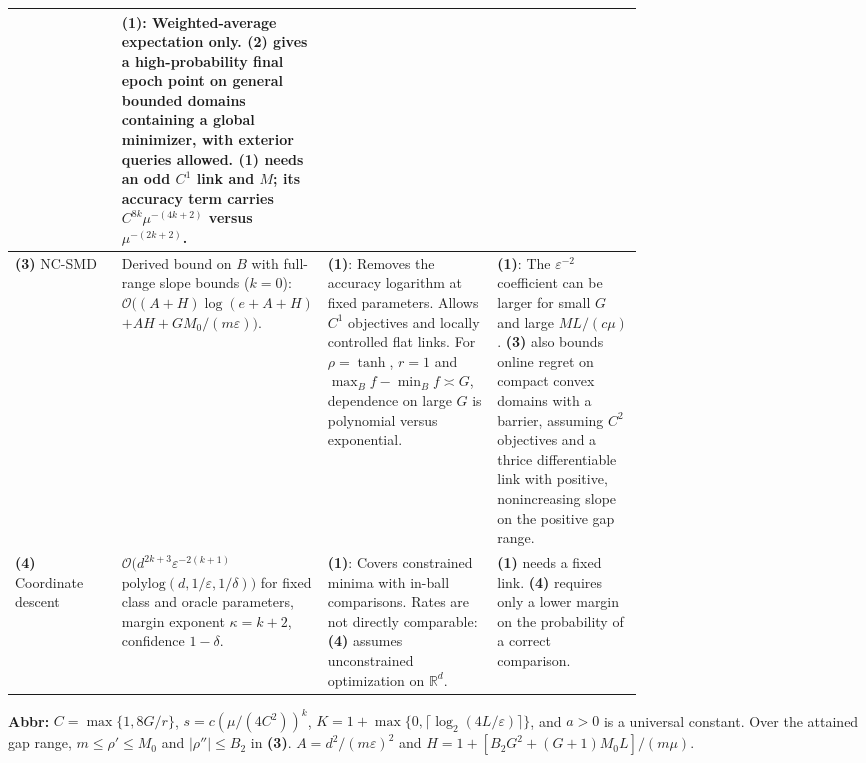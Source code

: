 \begin{table}[tp]
\begin{threeparttable}
\begin{tabularx}{\linewidth}{@{}>{\raggedright\arraybackslash}p{0.17\linewidth}>{\raggedright\arraybackslash}p{0.29\linewidth}>{\raggedright\arraybackslash}p{0.27\linewidth}>{\raggedright\arraybackslash}X@{}}
& \textbf{(1)}: Weighted-average expectation only. \textbf{(2)} gives a high-probability final epoch point on general bounded domains containing a global minimizer, with exterior queries allowed. \textbf{(1)} needs an odd $C^1$ link and $M$; its accuracy term carries $C^{8k}\mu^{-(4k+2)}$ versus $\mu^{-(2k+2)}$. \\
\midrule
\textbf{(3)} NC-SMD \citep[Thms.~4, 13]{ftdKumagai2017v2}
& Derived bound on $B$ with full-range slope bounds ($k=0$):
$\mathcal{O}\!\big((A+H)\log(e+A+H)$ $+AH+GM_0/(m\varepsilon)\big)$.
& \textbf{(1)}: Removes the accuracy logarithm at fixed parameters. Allows $C^1$ objectives and locally controlled flat links. For $\rho=\tanh$, $r=1$ and $\max_B f-\min_B f\asymp G$, dependence on large $G$ is polynomial versus exponential.
& \textbf{(1)}: The $\varepsilon^{-2}$ coefficient can be larger for small $G$ and large $ML/(c\mu)$. \textbf{(3)} also bounds online regret on compact convex domains with a barrier, assuming $C^2$ objectives and a thrice differentiable link with positive, nonincreasing slope on the positive gap range. \\
\midrule
\textbf{(4)} Coordinate descent \citep[Thm.~2]{ftdJamieson2012v1}
& $\mathcal{O}\!\big(d^{2k+3}\varepsilon^{-2(k+1)}$ $\mathrm{polylog}(d,1/\varepsilon,1/\delta)\big)$ for fixed class and oracle parameters, margin exponent $\kappa=k+2$, confidence $1-\delta$.
& \textbf{(1)}: Covers constrained minima with in-ball comparisons. Rates are not directly comparable: \textbf{(4)} assumes unconstrained optimization on $\mathbb R^d$.
& \textbf{(1)} needs a fixed link. \textbf{(4)} requires only a lower margin on the probability of a correct comparison. \\
\bottomrule
\end{tabularx}
\begin{tablenotes}[flushleft]\footnotesize
\item[] \textbf{Abbr:} $C=\max\{1,8G/r\}$, $s=c(\mu/(4C^2))^k$, $K=1+\max\{0,\lceil\log_2(4L/\varepsilon)\rceil\}$, and $a>0$ is a universal constant. Over the attained gap range, $m\le\rho'\le M_0$ and $|\rho''|\le B_2$ in \textbf{(3)}. $A=d^2/(m\varepsilon)^2$ and $H=1+[B_2G^2+(G+1)M_0L]/(m\mu)$.
\end{tablenotes}
\end{threeparttable}
\end{table}

